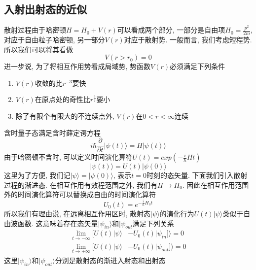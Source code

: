 \documentclass[a4paper,11pt]{book}
\begin{document}
\subsection{入射出射态的近似}
散射过程由于哈密顿$H=H_0+V(r)$可以看成两个部分, 一部分是自由项$H_0=\frac{p^2}{2m}$, 对应于自由粒子哈密顿, 另一部分$V(r)$对应于散射势. 一般而言, 我们考虑短程势. 所以我们可以将其看做
\begin{equation}
  V(r>r_0)=0
\end{equation}
进一步说, 为了将相互作用势看成局域势, 势函数$V(r)$必须满足下列条件
\begin{enumerate}
  \item $V(r)$收敛的比$r^{-3}$要快
  \item $V(r)$在原点处的奇性比$r^{\frac{3}{2}}$要小
  \item 除了有限个有限大的不连续点外, $V(r)$在$0<r<\infty$连续
\end{enumerate}
含时量子态满足含时薛定谔方程
\begin{equation}
  i\hbar\frac{\partial}{\partial t}|\psi(t)\rangle=H|\psi(t)\rangle
\end{equation}
由于哈密顿不含时, 可以定义时间演化算符$U(t)=exp(-\frac{i}{\hbar}Ht)$
\begin{equation}
  |\psi(t)\rangle=U(t)|\psi(0)\rangle
\end{equation}
这里为了方便, 我们记$|\psi\rangle=|\psi(0)\rangle$, 表示$t=0$时刻的态矢量. 下面我们引入散射过程的渐进态. 在相互作用有效程范围之外, 我们有$H\to H_0$. 因此在相互作用范围外的时间演化算符可以替换成自由的时间演化算符
\begin{equation}
  U_0(t)=e^{-\frac{i}{\hbar}H_0t}
\end{equation}
所以我们有理由说, 在远离相互作用区时, 散射态$|\psi\rangle$的演化行为$U(t)|\psi\rangle$类似于自由波函数. 这意味着存在态矢量$|\psi_{in}\rangle$和$|\psi_{out}$满足下列关系
\begin{equation}
  \begin{split}
     \lim_{t\to-\infty}[U(t)|\psi\rangle&-U_0(t)|\psi_{in}]\rangle=0\\
     \lim_{t\to+\infty}[U(t)|\psi\rangle&-U_0(t)|\psi_{out}]\rangle=0
  \end{split}
\end{equation}
这里$|\psi_{in}\rangle$和$|\psi_{out}\rangle$分别是散射态的渐进入射态和出射态
\end{document}
